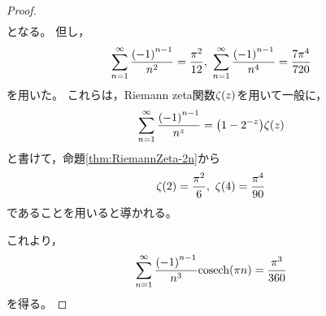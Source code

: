 \documentclass[a4paper,draft]{ltjsarticle}
\begin{document}
\begin{cor}
\begin{proof}
\begin{align}
        \end{align}
        となる。
        但し，
        \begin{equation}
            \sum_{n=1}^\infty \frac{\pare{-1}^{n-1}}{n^2}=\frac{\pi^2}{12},\
            \sum_{n=1}^\infty \frac{\pare{-1}^{n-1}}{n^4}=\frac{7\pi^4}{720}
        \end{equation}
        を用いた。
        これらは，Riemann zeta関数$\fun{\zeta}{z}$を用いて一般に，
        \begin{equation}
            \sum_{n=1}^\infty \frac{\pare{-1}^{n-1}}{n^z}=\pare{1-2^{-z}}\fun{\zeta}{z}
        \end{equation}
        と書けて，命題\ref{thm:RiemannZeta-2n}から
        \begin{equation}
            \fun{\zeta}{2}=\frac{\pi^2}{6},\
            \fun{\zeta}{4}=\frac{\pi^4}{90}
        \end{equation}
        であることを用いると導かれる。

        これより，
        \begin{equation}
            \sum_{n=1}^\infty \dfrac{\pare{-1}^{n-1}}{n^3}\fun{\cosech}{\pi n}=\dfrac{\pi^3}{360}
        \end{equation}
        を得る。
    \end{proof}
\end{cor}
\end{document}
